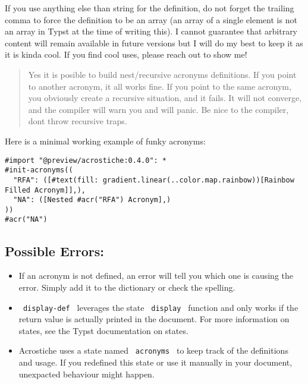 If you use anything else than string for the definition, do not forget
the trailing comma to force the definition to be an array (an array of a
single element is not an array in Typst at the time of writing this). I
cannot guarantee that arbitrary content will remain available in future
versions but I will do my best to keep it as it is kinda cool. If you
find cool uses, please reach out to show me!

\begin{quote}
Yes it is posible to build nest/recursive acronyms definitions. If you
point to another acronym, it all works fine. If you point to the same
acronym, you obviously create a recursive situation, and it fails. It
will not converge, and the compiler will warn you and will panic. Be
nice to the compiler, don\textquotesingle t throw recursive traps.
\end{quote}

Here is a minimal working example of funky acronyms:

\begin{verbatim}
#import "@preview/acrostiche:0.4.0": *                                                           
#init-acronyms((
  "RFA": ([#text(fill: gradient.linear(..color.map.rainbow))[Rainbow Filled Acronym]],),                                                             
  "NA": ([Nested #acr("RFA") Acronym],)
))
#acr("NA")
\end{verbatim}

\subsection{Possible Errors:}\label{possible-errors}

\begin{itemize}
\tightlist
\item
  If an acronym is not defined, an error will tell you which one is
  causing the error. Simply add it to the dictionary or check the
  spelling.
\item
  \texttt{\ display-def\ } leverages the state \texttt{\ display\ }
  function and only works if the return value is actually printed in the
  document. For more information on states, see the Typst documentation
  on states.
\item
  Acrostiche uses a state named \texttt{\ acronyms\ } to keep track of
  the definitions and usage. If you redefined this state or use it
  manually in your document, unexpacted behaviour might happen.
\end{itemize}

